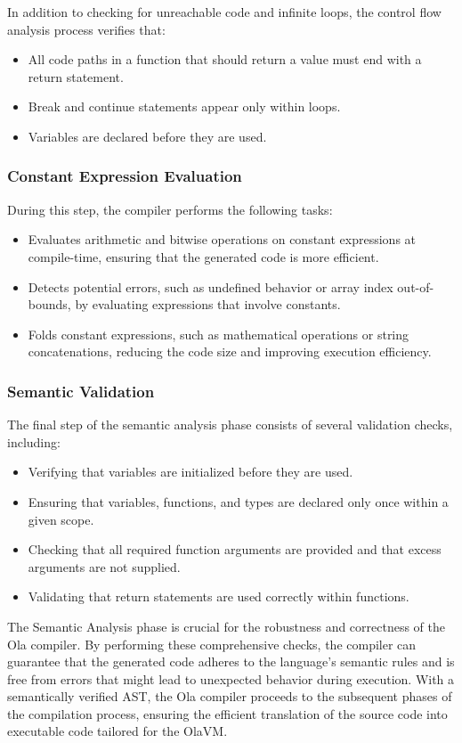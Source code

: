 In addition to checking for unreachable code and infinite loops, the control flow analysis process verifies that:

\begin{itemize}
 \item All code paths in a function that should return a value must end with a return statement.
 \item Break and continue statements appear only within loops.
 \item Variables are declared before they are used.
\end{itemize}

\subsubsection*{Constant Expression Evaluation}

During this step, the compiler performs the following tasks:

\begin{itemize}
  \item Evaluates arithmetic and bitwise operations on constant expressions at compile-time, ensuring that the generated code is more efficient.

  \item Detects potential errors, such as undefined behavior or array index out-of-bounds, by evaluating expressions that involve constants.

  \item Folds constant expressions, such as mathematical operations or string concatenations, reducing the code size and improving execution efficiency.

\end{itemize}

\subsubsection*{Semantic Validation}
 The final step of the semantic analysis phase consists of several validation checks, including:

\begin{itemize}
  \item Verifying that variables are initialized before they are used.
  \item Ensuring that variables, functions, and types are declared only once within a given scope.
  \item Checking that all required function arguments are provided and that excess arguments are not supplied.
  \item Validating that return statements are used correctly within functions.

\end{itemize}

The Semantic Analysis phase is crucial for the robustness and correctness of the Ola compiler. By performing these comprehensive checks, the compiler can guarantee that the generated code adheres to the language's semantic rules and is free from errors that might lead to unexpected behavior during execution. With a semantically verified AST, the Ola compiler proceeds to the subsequent phases of the compilation process, ensuring the efficient translation of the source code into executable code tailored for the OlaVM.

